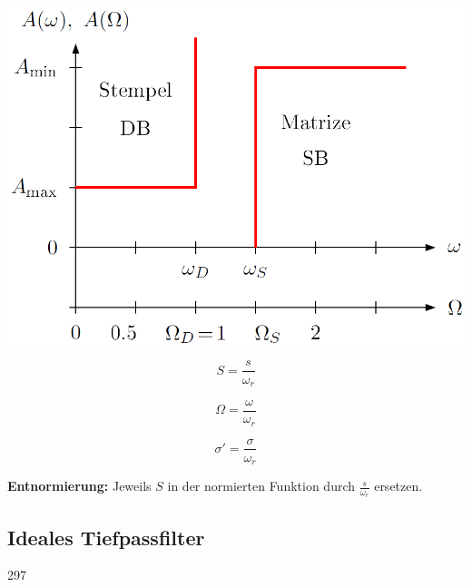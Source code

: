 \begin{minipage}[c]{0.48\columnwidth}
    \includegraphics[width=\columnwidth]{images/filter_toleranzschema_frequenznormierung.png}
\end{minipage}
\hfill
\begin{minipage}[c]{0.48\columnwidth}
    \begin{center}
       \textbf{}  
    \end{center}

    \vspace{-0.3cm}
    \begin{minipage}[c]{0.3\columnwidth}
        $$ \boxed{ S = \frac{s}{\omega_r}} $$
    \end{minipage}
    \hfill
    \begin{minipage}[c]{0.3\columnwidth}
        $$ \boxed{ \Omega = \frac{\omega}{\omega_r}} $$
    \end{minipage}
    \hfill
    \begin{minipage}[c]{0.3\columnwidth}
        $$ \boxed{ \sigma' = \frac{\sigma}{\omega_r}} $$ 
    \end{minipage}

    \vspace{0.2cm}
    \textbf{Entnormierung:} Jeweils $S$ in der normierten Funktion durch $\frac{s}{\omega_r}$ ersetzen.
\end{minipage}


\subsection{Ideales Tiefpassfilter}{297}

